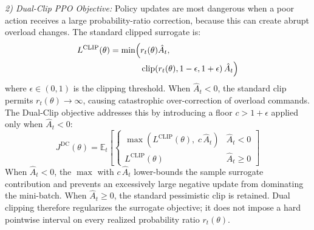 \documentclass[lettersize,journal]{IEEEtran}
\providecommand{\DIFadd}[1]{{\protect\color{blue} #1}} %
\providecommand{\DIFdel}[1]{} %
\providecommand{\DIFaddbegin}{} %
\providecommand{\DIFaddend}{} %
\providecommand{\DIFdelbegin}{} %
\providecommand{\DIFdelend}{} %
\begin{document}
\emph{2) Dual-Clip PPO Objective:} Policy updates are most dangerous when a poor action receives a large probability-ratio correction, because this can create abrupt overload changes. The standard clipped surrogate is:
\begin{equation}
\label{eq:standard_clip}
\begin{split}
L^{\mathrm{CLIP}}(\theta) = \min \Bigl( &r_t(\theta)\hat{A}_t, \\
&\operatorname{clip}\!\left(r_t(\theta), 1-\epsilon, 1+\epsilon\right)\hat{A}_t \Bigr)
\end{split}
\end{equation}
where $\epsilon \in (0,1)$ is the clipping threshold. When $\hat{A}_t < 0$, the standard clip permits $r_t(\theta) \to \infty$, causing catastrophic over-correction of overload commands. The Dual-Clip objective addresses this by introducing a floor $c > 1+\epsilon$ applied only when $\hat{A}_t < 0$:
\begin{equation}
\label{eq:dual_clip_final}
J^{\mathrm{DC}}(\theta) = \mathbb{E}_{t} \left[
\begin{cases}
\max\!\left( L^{\mathrm{CLIP}}(\theta),\; c\,\hat{A}_t \right) & \hat{A}_t < 0 \\[4pt]
L^{\mathrm{CLIP}}(\theta) & \hat{A}_t \geq 0
\end{cases}
\right]
\end{equation}
When $\hat{A}_t < 0$, the $\max$ with $c\,\hat{A}_t$ \DIFdelbegin \DIFdel{bounds $r_t(\theta) \leq c$, preventing the
policy from over-penalizing actions that only marginally degrade performance}\DIFdelend \DIFaddbegin \DIFadd{lower-bounds the
sample surrogate contribution and prevents an excessively large negative
update from dominating the mini-batch}\DIFaddend . When $\hat{A}_t \geq 0$, the standard
pessimistic clip \DIFdelbegin \DIFdel{suffices. The effective constraint on $r_t(\theta)$ under the dual-clip is therefore:
}%
\DIFdelend \DIFaddbegin \DIFadd{is retained. Dual clipping therefore regularizes the
surrogate objective; it does not impose a hard pointwise interval on every
realized probability ratio \(r_t(\theta)\).
}\DIFaddend 
\end{document}

